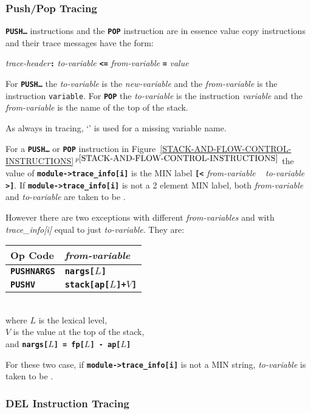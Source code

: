 \documentclass[12pt]{article}
\newcommand{\TT}[1]{{\tt \bfseries #1}}
\newcommand{\itemref}[1]{\ref{#1}$\,^{p\pageref{#1}}$}
\newcommand{\EOL}{\penalty \exhyphenpenalty}
\begin{document}
\subsubsection{Push/Pop Tracing}
\label{PUSH/POP-TRACING}

\TT{PUSH\ldots} instructions and the \TT{POP} instruction are in essence
value copy instructions and their trace messages
have the form:

\begin{center}
{\em trace-header}\TT{:} {\em to-variable}
                    \TT{<=} {\em from-variable} \TT{=} {\em value}
\end{center}

For \TT{PUSH\ldots} the {\em to-variable} is the {\em new-variable}
and the {\em from-variable} is the instruction {\tt variable}.
For \TT{POP} the {\em to-variable} is the instruction {\em variable}
and the {\em from-variable} is the name of the top of the stack.

As always in tracing, `\TT{*}' is used for a missing variable name.

For a \TT{PUSH\ldots} or \TT{POP} instruction
in Figure~\itemref{STACK-AND-FLOW-CONTROL-INSTRUCTIONS}
the value of
\TT{module->\EOL trace\_\EOL info[i]} is the MIN label
\TT{[<} {\em from-variable} ~ {\em to-variable} \TT{>]}.
If \TT{module->\EOL trace\_\EOL info[i]} is not a 2 element MIN label,
both {\em from-variable} and {\em to-variable} are taken to be \TT{*}.

However there are two exceptions with different {\em from-variables}
and with {\em trace\_\EOL info[i]} equal to just {\em to-variable}.
They are:
\begin{center}
\begin{tabular}{l@{~~~~~}l}
\bf Op Code & \bf \em from-variable
\\\hline
\TT{PUSHNARGS} & \TT{nargs[$L$]} \\
\TT{PUSHV}     & \TT{stack[ap[$L$]+$V$]}
\end{tabular}
\\[1ex]
where $L$ is the lexical level, \\
$V$ is the value at the top of the stack, \\
and \TT{nargs[$L$] = fp[$L$] - ap[$L$]}
\end{center}
For these two case,
if \TT{module->\EOL trace\_\EOL info[i]} is not a MIN string,
{\em to-variable} is taken to be \TT{*}.

\subsubsection{DEL Instruction Tracing}
\label{DEL-INSTRUCTION-TRACING}
\end{document}

